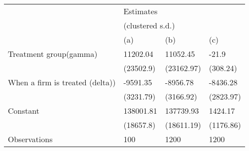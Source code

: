 \begin{tabular}{llll}
\toprule
{} & \multicolumn{3}{l}{Estimates} \\
{} & \multicolumn{3}{l}{(clustered s.d.)} \\
{} &              (a) &         (b) &        (c) \\
\midrule
Treatment group(gamma)          &         11202.04 &    11052.45 &      -21.9 \\
                                &        (23502.9) &  (23162.97) &   (308.24) \\
When a firm is treated (delta)) &         -9591.35 &    -8956.78 &   -8436.28 \\
                                &        (3231.79) &   (3166.92) &  (2823.97) \\
Constant                        &        138001.81 &   137739.93 &    1424.17 \\
                                &        (18657.8) &  (18611.19) &  (1176.86) \\
Observations                    &              100 &        1200 &       1200 \\
\bottomrule
\end{tabular}
